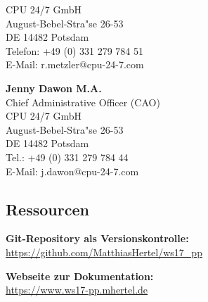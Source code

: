 \documentclass[12pt]{article}
\begin{document}
CPU 24/7 GmbH \\
August-Bebel-Stra"se 26-53\\
DE 14482 Potsdam\\

Telefon: +49 (0) 331 279 784 51 \\
E-Mail: r.metzler@cpu-24-7.com

\bigbreak
\bigbreak
\textbf{Jenny Dawon M.A.}\\
Chief Administrative Officer (CAO)\\

CPU 24/7 GmbH\\
August-Bebel-Stra"se 26-53\\
DE 14482 Potsdam\\

Tel.: +49 (0) 331 279 784 44\\
E-Mail: j.dawon@cpu-24-7.com

\subsection{Ressourcen}
\textbf{Git-Repository als Versionskontrolle:}\\
\url{https://github.com/MatthiasHertel/ws17_pp}

\textbf{Webseite zur Dokumentation:}\\
\url{https://www.ws17-pp.mhertel.de}



\clearpage
\setlength\bibitemsep{10pt}
\renewcommand*{\bibfont}{\footnotesize}

\printbibliography[type=tech,heading=bibintoc, title=Verwendete Technologien]
\newpage
\renewcommand*{\bibfont}{\footnotesize}
\printbibliography[type=package,heading=bibintoc, title=Wichtige Go-Packages]
\newpage
{}
{}
\listoffigures
\newpage

%



\end{document}
